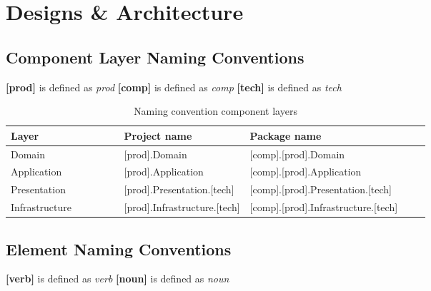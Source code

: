 \chapter{Designs \& Architecture} \label{appendix_designs} 

\section{Component Layer Naming Conventions} \label{appendix_component_naming_convention}

\textbf{[\gls{prod}]} is defined as \textit{\glsdesc{prod}} \newline 
\textbf{[\gls{comp}]} is defined as \textit{\glsdesc{comp}} \newline 
\textbf{[\gls{tech}]} is defined as \textit{\glsdesc{tech}} 

\begin{table}[H]
    \footnotesize
    \begin{tabular}{ l p{0.30\linewidth} p{0.43\linewidth} }
    \hline
    \textbf{Layer} & \textbf{Project name} & \textbf{Package name} \\ 
    \hline
    Domain & [\gls{prod}].Domain & [\gls{comp}].[\gls{prod}].Domain \\
    Application & [\gls{prod}].Application & [\gls{comp}].[\gls{prod}].Application \\
    Presentation & [\gls{prod}].Presentation.[\gls{tech}] & [\gls{comp}].[\gls{prod}].Presentation.[\gls{tech}] \\
    Infrastructure & [\gls{prod}].Infrastructure.[\gls{tech}] & [\gls{comp}].[\gls{prod}].Infrastructure.[\gls{tech}]
    \\ \hline
    \end{tabular}
\caption{Naming convention component layers}
\label{table:component_naming_convention}
\end{table}

\section{Element Naming Conventions} \label{appendix_element_naming_convention}

\textbf{[\gls{verb}]} is defined as \textit{\glsdesc{verb}} \newline 
\textbf{[\gls{noun}]} is defined as \textit{\glsdesc{noun}} 

